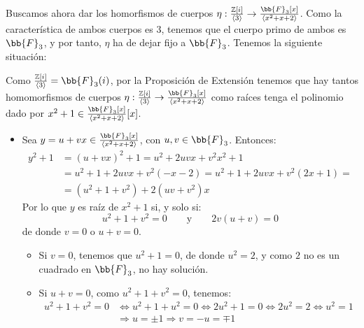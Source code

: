 \begin{ejercicio}
    Buscamos ahora dar los homorfismos de cuerpos $\eta:\frac{\mathbb{Z}[i]}{\langle 3 \rangle }\to \frac{\bb{F}_3[x]}{\langle x^2+x+2 \rangle }$. Como la característica de ambos cuerpos es 3, tenemos que el cuerpo primo de ambos es $\bb{F}_3$, y por tanto, $\eta$ ha de dejar fijo a $\bb{F}_3$. Tenemos la siguiente situación:
    \begin{figure}[ht]
        \centering
    \end{figure}

    Como $\frac{\mathbb{Z}[i]}{\langle 3 \rangle } = \bb{F}_3(i)$, por la Proposición de Extensión tenemos que hay tantos homomorfismos de cuerpos $\eta:\frac{\mathbb{Z}[i]}{\langle 3 \rangle }\to \frac{\bb{F}_3[x]}{\langle x^2+x+2 \rangle }$ como raíces tenga el polinomio dado por $x^2+1\in \frac{\bb{F}_3[x]}{\langle x^2+x+2 \rangle }[x]$.
    \begin{itemize}
        \item Sea $y=u+vx \in \frac{\bb{F}_3[x]}{\langle x^2+x+2 \rangle }$, con $u,v\in \bb{F}_3$. Entonces:
            \begin{align*}
                y^2 + 1 &= {(u+vx )}^2 + 1 = u^2 + 2uvx + v^2x^2 + 1 \\ &= u^2 + 1 + 2uvx + v^2(-x-2) = u^2 +1+2uvx + v^2(2x+1)
                =\\&= (u^2+1+v^2) + 2(uv+v^2)x
            \end{align*}
            Por lo que $y$ es raíz de $x^2+1$ si, y solo si:
            \begin{equation*}
                u^2+1+v^2 = 0 \qquad\text{y}\qquad 2v(u+v) = 0
            \end{equation*}
            de donde $v=0$ o $u+v=0$.
            \begin{itemize}
                \item Si $v=0$, tenemos que $u^2+1 = 0$, de donde $u^2 = 2$, y como $2$ no es un cuadrado en $\bb{F}_3$, no hay solución.
                \item Si $u+v=0$, como $u^2+1+v^2 = 0$, tenemos:
                \begin{align*}
                    u^2+1+v^2 = 0 &\Longleftrightarrow u^2+1+u^2 = 0 \Longleftrightarrow 2u^2 + 1 = 0 \Longleftrightarrow 2u^2 = 2 \Longleftrightarrow u^2 = 1 \\ &\Longrightarrow u = \pm 1 \Longrightarrow v = -u = \mp 1
                \end{align*}


\end{itemize}
\end{itemize}
\end{ejercicio}
